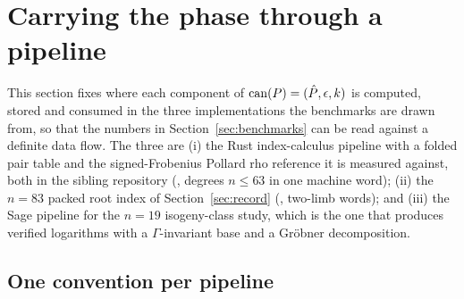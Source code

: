 \section{Carrying the phase through a pipeline}
\label{sec:pipeline}

This section fixes where each component of $\operatorname{can}(P)=(\hat P,\epsilon,k)$
is computed, stored and consumed in the three implementations the
benchmarks are drawn from, so that the numbers in
Section~\ref{sec:benchmarks} can be read against a definite data
flow. The three are (i) the Rust index-calculus pipeline with a folded
pair table and the signed-Frobenius Pollard rho reference it is
measured against, both in the sibling repository
(\sibling, degrees $n\le 63$ in one machine word);
(ii) the $n=83$ packed root index of Section~\ref{sec:record}
(\thislib, two-limb words); and (iii) the Sage pipeline for the $n=19$
isogeny-class study, which is the one that produces verified
logarithms with a $\Gamma$-invariant base and a Gr\"obner
decomposition.

\subsection{One convention per pipeline}
\label{sec:conventions}

